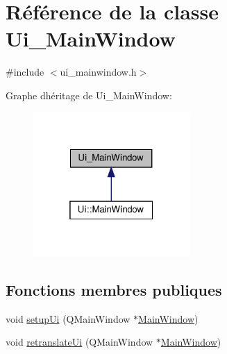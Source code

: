 \hypertarget{class_ui___main_window}{}\section{Référence de la classe Ui\+\_\+\+Main\+Window}
\label{class_ui___main_window}


{\ttfamily \#include $<$ui\+\_\+mainwindow.\+h$>$}



Graphe d\textquotesingle{}héritage de Ui\+\_\+\+Main\+Window\+:
\nopagebreak
\begin{figure}[H]
\begin{center}
\leavevmode
\includegraphics[width=169pt]{class_ui___main_window__inherit__graph}
\end{center}
\end{figure}
\subsection*{Fonctions membres publiques}
\begin{DoxyCompactItemize}
\item 
void \hyperlink{class_ui___main_window_acf4a0872c4c77d8f43a2ec66ed849b58}{setup\+Ui} (Q\+Main\+Window $\ast$\hyperlink{class_main_window}{Main\+Window})
\item 
void \hyperlink{class_ui___main_window_a097dd160c3534a204904cb374412c618}{retranslate\+Ui} (Q\+Main\+Window $\ast$\hyperlink{class_main_window}{Main\+Window})
\end{DoxyCompactItemize}
